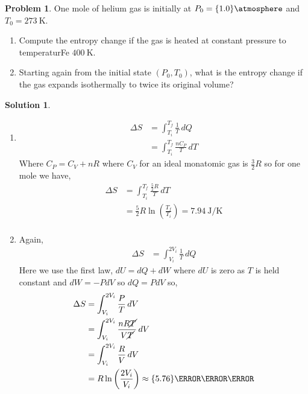 \documentclass[10pt]{article}
\theoremstyle{definition}
\newtheorem{problem}{Problem}
\newtheorem{soln}{Solution}
\begin{document}
\begin{problem}
One mole of helium gas is initially at $P_0=\qty{1.0}{\atmosphere}$ and $T_0=\qty{273}{\kelvin}$.
\begin{enumerate}[label=(\alph*)]
  \item Compute the entropy change if the gas is heated at constant pressure to temperaturFe $\qty{400}{\kelvin}$.
  \item Starting again from the initial state $(P_0, T_0)$, what is the entropy change if
        the gas expands isothermally to twice its original volume?
\end{enumerate}
\end{problem}
\begin{soln}~
  \begin{enumerate}[label=(\alph*)]
    \item \begin{align*}
            \Delta S & = \int_{T_i}^{T_f}\frac{1}{T}\,dQ    \\
                     & = \int_{T_i}^{T_f}\frac{nC_P}{T}\,dT
          \end{align*}
          Where $C_P=C_V+nR$ where $C_V$ for an ideal monatomic gas is $\frac{3}{2}R$ so for one mole we have,
          \begin{align*}
            \Delta S & = \int_{T_i}^{T_f}\frac{\frac{5}{2}R}{T}\,dT                                \\
                     & = \frac{5}{2}R\ln\left(\frac{T_f}{T_i}\right)=\qty{7.94}{\joule\per\kelvin} \\
          \end{align*}
    \item Again,
          \begin{align*}
            \Delta S & = \int_{V_i}^{2V_i}\frac{1}{T}\,dQ
          \end{align*}
          Here we use the first law, $dU=dQ+dW$ where $dU$ is zero as $T$ is held constant and $dW=-PdV$ so $dQ=PdV$ so,
          \begin{align*}
            \Delta S & = \int_{V_i}^{2V_i}\frac{P}{T}\,dV                                      \\
                     & = \int_{V_i}^{2V_i}\frac{nR\cancel{T}}{V\cancel{T}}\,dV                 \\
                     & = \int_{V_i}^{2V_i}\frac{R}{V}\,dV                                      \\
                     & = R\ln\left(\frac{2V_i}{V_i}\right)\approx\qty{5.76}{\joule\per\kelvin} \\
          \end{align*}
  \end{enumerate}
\end{soln}
\end{document}
